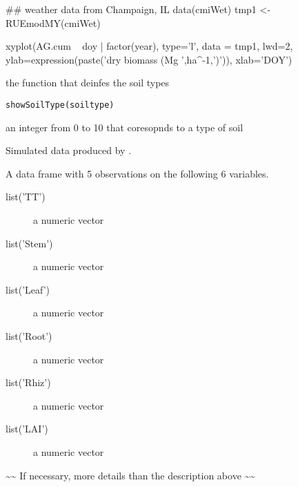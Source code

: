 \documentclass[letterpaper]{book}
\begin{document}
%
\begin{Examples}
\begin{ExampleCode}
## weather data from Champaign, IL
data(cmiWet)
tmp1 <- RUEmodMY(cmiWet)

xyplot(AG.cum ~ doy | factor(year), type='l', data = tmp1,
       lwd=2,
       ylab=expression(paste('dry biomass (Mg ',ha^-1,')')),
       xlab='DOY')
\end{ExampleCode}
\end{Examples}
%
\begin{Description}\relax
the function that deinfes the soil types
\end{Description}
%
\begin{Usage}
\begin{verbatim}
showSoilType(soiltype)
\end{verbatim}
\end{Usage}
%
\begin{Arguments}
\begin{ldescription}
\item[\code{soiltype}] an integer from 0 to 10 that coresopnds
to a type of soil
\end{ldescription}
\end{Arguments}
%
\begin{Description}\relax
Simulated data produced by .
\end{Description}
%
\begin{Format}
A data frame with 5 observations on the following 6 variables.
\begin{description}
 \item[list('TT')] a numeric vector\item[list('Stem')] a
numeric vector\item[list('Leaf')] a numeric vector\item[list('Root')] a
numeric vector\item[list('Rhiz')] a numeric vector\item[list('LAI')] a
numeric vector
\end{description}
\end{Format}
%
\begin{Details}\relax
\textasciitilde{}\textasciitilde{} If necessary, more details than the description above \textasciitilde{}\textasciitilde{}
\end{Details}
\end{document}
